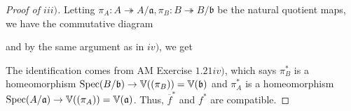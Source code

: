 \documentclass[12pt,letterpaper]{article}
\theoremstyle{definition}
\theoremstyle{remark}
\numberwithin{figure}{problem}
\numberwithin{equation}{section}
\DeclareMathOperator{\Spec}{Spec}
\let\ker\relax
\DeclareMathOperator{\ker}{Ker}
\begin{document}
\begin{proof}[Proof of $iii)$]
  Letting $\pi_A : A \twoheadrightarrow A/\mathfrak{a},\pi_B : B \twoheadrightarrow B/\mathfrak{b}$ be the natural quotient maps, we have the commutative diagram
  \begin{center}
  \end{center}
  and by the same argument as in $iv)$, we get
  \begin{center}
  \end{center}
  The identification comes from AM Exercise $1.21iv)$, which says $\pi_B^*$ is a homeomorphism $\Spec(B/\mathfrak{b}) \to \mathbb{V}(\ker(\pi_B)) = \mathbb{V}(\mathfrak{b})$ and $\pi_A^*$ is a homeomorphism $\Spec(A/\mathfrak{a}) \to \mathbb{V}(\ker(\pi_A)) = \mathbb{V}(\mathfrak{a})$. Thus, $\overline{f}^*$ and $f^*$ are compatible.
\end{proof}
\end{document}
